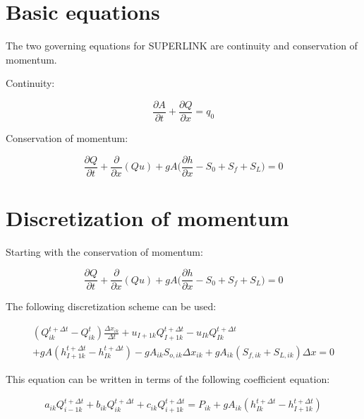 \documentclass[11pt]{article}
\begin{document}
\section{Basic equations}

The two governing equations for SUPERLINK are continuity and conservation of momentum.

Continuity:

\begin{equation}
  \frac{\partial A}{\partial t} + \frac{\partial Q}{\partial x} = q_0
\end{equation}

Conservation of momentum:

\begin{equation}
  \frac{\partial Q}{\partial t} + \frac{\partial}{\partial x} (Q u) + g A \biggl(\frac{\partial h}{\partial x} - S_0 + S_f + S_L \biggr) = 0
\end{equation}

\section{Discretization of momentum}

Starting with the conservation of momentum:

\begin{equation}
  \frac{\partial Q}{\partial t} + \frac{\partial}{\partial x} (Q u) + g A \biggl(\frac{\partial h}{\partial x} - S_0 + S_f + S_L \biggr) = 0
\end{equation}

The following discretization scheme can be used:

\begin{equation}
  \begin{split}
    (Q_{ik}^{t + \Delta t} - Q_{ik}^t) \frac{\Delta x_{ik}}{\Delta t} + u_{I+1k}
    Q_{I + 1k}^{t + \Delta t} - u_{Ik} Q_{Ik}^{t + \Delta t} \\
    + g A (h_{I+1k}^{t + \Delta t} - h_{Ik}^{t + \Delta t}) 
    - g A_{ik} S_{o,ik} \Delta x_{ik} + g
    A_{ik} (S_{f,ik} + S_{L,ik}) \Delta x = 0
  \end{split}
\end{equation}

This equation can be written in terms of the following coefficient equation:

\begin{equation}
  \boxed{
  \begin{split}
    a_{ik} Q_{i - 1k}^{t + \Delta t} + b_{ik} Q_{ik}^{t + \Delta t} + c_{ik} Q_{i + 1k}^{t + \Delta t} =
    P_{ik} + g A_{ik} (h_{Ik}^{t + \Delta t} - h_{I+1k}^{t + \Delta t})
  \end{split}
  }
\end{equation}
\end{document}
